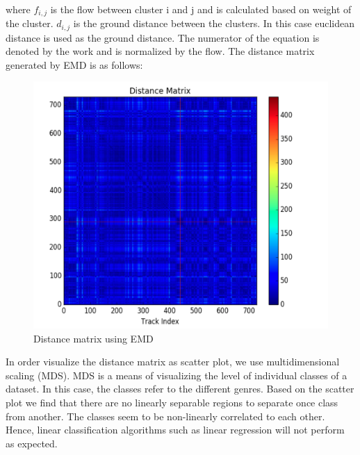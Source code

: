 \documentclass[12pt]{article}
\begin{document}
\paragraph{}
where $f_{i,j}$ is the flow between cluster i and j and is calculated based on weight of the cluster. $d_{i,j}$ is the ground distance between the clusters. In this case euclidean distance is used as the ground distance. The numerator of the equation is denoted by the work and is normalized by the flow. The distance matrix generated by EMD is as follows:
\begin{figure}[H]\label{emd_dist}
\center
\includegraphics[scale=0.70]{emd_dist.png}
\caption{Distance matrix using EMD}
\end{figure}
In order visualize the distance matrix as scatter plot, we use multidimensional scaling (MDS). MDS is a means of visualizing the level of individual classes of a dataset. In this case, the classes refer to the different genres. Based on the scatter plot we find that there are no linearly separable regions to separate once class from another. The classes seem to be non-linearly correlated to each other. Hence, linear classification algorithms such as linear regression will not perform as expected.
\end{document}
